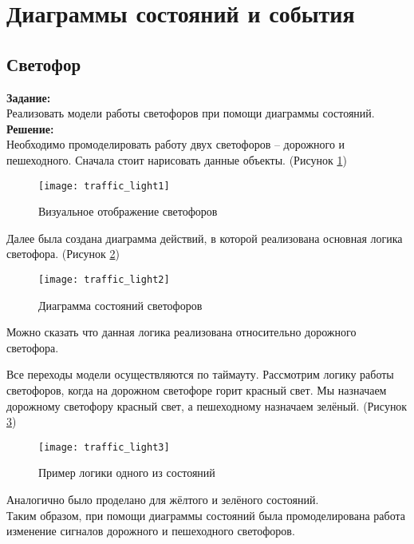 \section*{Диаграммы состояний и события}
\subsection*{Светофор}

\textbf{Задание:}\\
Реализовать модели работы светофоров при помощи диаграммы состояний.\\

\textbf{Решение:}\\
Необходимо промоделировать работу двух светофоров -- дорожного и пешеходного. Сначала стоит нарисовать данные объекты. (Рисунок \ref{fig:traffic_light1})
\begin{figure}[h]
	\centering \texttt{[image: traffic\_light1]}
	\caption{Визуальное отображение светофоров}
	\label{fig:traffic_light1}
\end{figure}

Далее была создана диаграмма действий, в которой реализована основная логика светофора. (Рисунок \ref{fig:traffic_light2})
\begin{figure}[h]
	\centering \texttt{[image: traffic\_light2]}
	\caption{Диаграмма состояний светофоров}
	\label{fig:traffic_light2}
\end{figure}

Можно сказать что данная логика реализована относительно дорожного светофора.

\newpage

Все переходы модели осуществляются по таймауту. Рассмотрим логику работы светофоров, когда на дорожном светофоре горит красный свет. Мы назначаем дорожному светофору красный свет, а пешеходному назначаем зелёный. (Рисунок \ref{fig:traffic_light3})
\begin{figure}[h]
	\centering \texttt{[image: traffic\_light3]}
	\caption{Пример логики одного из состояний}
	\label{fig:traffic_light3}
\end{figure}

Аналогично было проделано для жёлтого и зелёного состояний.\\

Таким образом, при помощи диаграммы состояний была промоделирована работа изменение сигналов дорожного и пешеходного светофоров.
